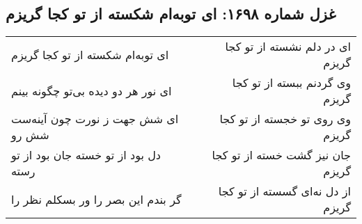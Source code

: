 \begin{center}
\section*{غزل شماره ۱۶۹۸: ای توبه‌ام شکسته از تو کجا گریزم}
\label{sec:1698}
\begin{longtable}{l p{0.5cm} r}
ای توبه‌ام شکسته از تو کجا گریزم
&&
ای در دلم نشسته از تو کجا گریزم
\\
ای نور هر دو دیده بی‌تو چگونه بینم
&&
وی گردنم ببسته از تو کجا گریزم
\\
ای شش جهت ز نورت چون آینه‌ست شش رو
&&
وی روی تو خجسته از تو کجا گریزم
\\
دل بود از تو خسته جان بود از تو رسته
&&
جان نیز گشت خسته از تو کجا گریزم
\\
گر بندم این بصر را ور بسکلم نظر را
&&
از دل نه‌ای گسسته از تو کجا گریزم
\\
\end{longtable}
\end{center}

